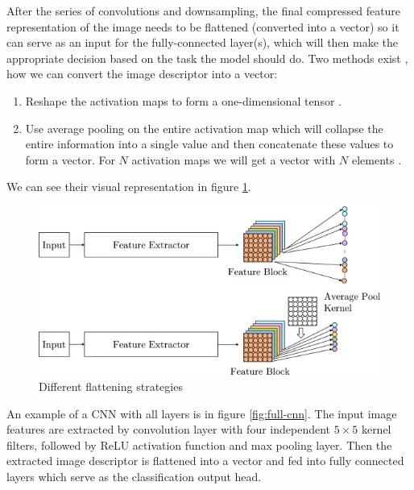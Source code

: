 After the series of convolutions and downsampling, the final compressed feature representation of the image needs to be flattened (converted into a vector) so it can serve as an input for the fully-connected layer(s), which will then make the appropriate decision based on the task the model should do. Two methods exist \cite{Santosh2022-2}, how we can convert the image descriptor into a vector:

\begin{enumerate}
    \item Reshape the activation maps to form a one-dimensional tensor \cite{Krizhevsky2012, LeCun2015-2}.
    \item Use average pooling on the entire activation map which will collapse the entire information into a single value and then concatenate these values to form a vector. For $N$ activation maps we will get a vector with $N$ elements \cite{He2016, Szegedy2015}.
\end{enumerate}

We can see their visual representation in figure \ref{fig:flatenning}.

\begin{figure}[H]
\begin{centering}
\includegraphics[width=12cm]{assets/images/flattening.jpg}
\par\end{centering}
\caption{Different flattening strategies \cite{Santosh2022-2}}
\label{fig:flatenning}
\end{figure}

An example of a CNN with all layers is in figure \ref{fig:full-cnn}. The input image features are extracted by convolution layer with four independent $5\times5$ kernel filters, followed by ReLU activation function and max pooling layer. Then the extracted image descriptor is flattened into a vector and fed into fully connected layers which serve as the classification output head.

